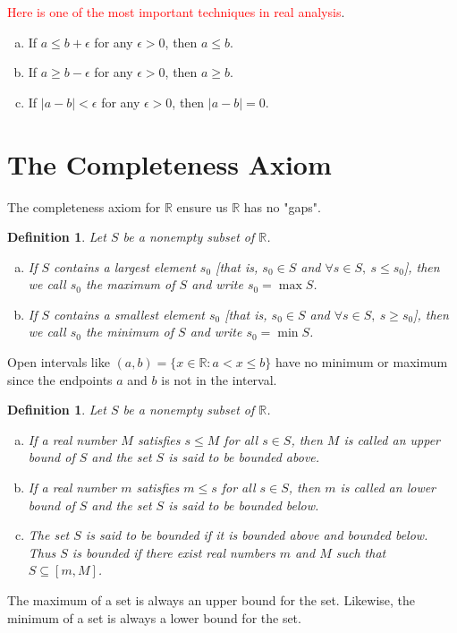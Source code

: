 \documentclass[12pt, lettersize]{book}
\newtheorem{dfn}[thm]{Definition}
\newcommand{\R}{\mathbb{R}}
\begin{document}
		\begin{tcolorbox}
			\textcolor{red}{Here is one of the most important techniques in real analysis}.
			\begin{enumerate}[(a)]
				\item If $a\leq b+\epsilon$ for any $\epsilon>0$, then $a\leq b$.
				\item If $a\geq b-\epsilon$ for any $\epsilon>0$, then $a\geq b$.
				\item If $|a-b|<\epsilon$ for any $\epsilon>0$, then $|a-b|=0$.
			\end{enumerate}
		\end{tcolorbox}
	
		\newpage
	\section{The Completeness Axiom}
		The completeness axiom for $\R$ ensure us $\R$ has no "gaps".
		\begin{dfn}\label{def:4.1}
		Let $S$ be a nonempty subset of $\R$.
		\begin{enumerate}[(a)]
			\item If $S$ contains a largest element $s_0$ [that is, $s_0\in S$ and $\forall s\in S,\ s\leq s_0$], then we call $s_0$ the \emph{maximum} of $S$ and write $s_0=\max S$.
			\item If $S$ contains a smallest element $s_0$ [that is, $s_0\in S$ and $\forall s\in S,\ s\geq s_0$], then we call $s_0$ the \emph{minimum} of $S$ and write $s_0=\min S$. 
		\end{enumerate}
		\end{dfn}
		Open intervals like $(a,b)=\{x\in\R: a<x\leq b\}$ have no minimum or maximum since the endpoints $a$ and $b$ is not in the interval.
		
		\begin{dfn}\label{def:4.2}
		Let $S$ be a nonempty subset of $\R$.
		\begin{enumerate}[(a)]
			\item If a real number $M$ satisfies $s\leq M$ for all $s\in S$, then $M$ is called an \emph{upper bound} of $S$ and the set $S$ is said to be \emph{bounded above}.
			\item If a real number $m$ satisfies $m\leq s$ for all $s\in S$, then $m$ is called an \emph{lower bound} of $S$ and the set $S$ is said to be \emph{bounded below}.
			\item The set $S$ is said to be \emph{bounded} if it is bounded above and bounded below. Thus $S$ is bounded if there exist real numbers $m$ and $M$ such that $S\subseteq[m,M]$.
		\end{enumerate}
		\end{dfn}
		The maximum of a set is always an upper bound for the set. Likewise, the minimum of a set is always a lower bound for the set.
	
\end{document}
